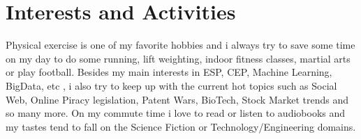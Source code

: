 \documentclass[a4paper,10pt]{article}
\begin{document}
\section{Interests and Activities}
Physical exercise is one of my favorite hobbies and i always try to save some time on my day to do some running, lift weighting, indoor fitness classes, martial arts or play football.
Besides my main interests in ESP, CEP, Machine Learning, BigData, etc , i also try to keep up with the current hot topics such as Social Web, Online Piracy legislation, Patent Wars, BioTech, Stock Market trends and so many more.
On my commute time i love to read or listen to audiobooks and my tastes tend to fall on the Science Fiction or Technology/Engineering domains.
\end{document}
